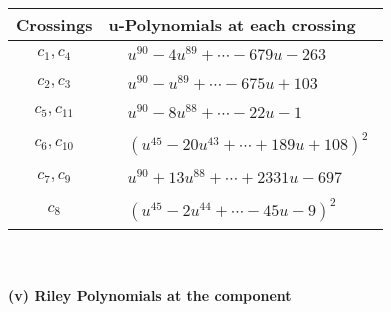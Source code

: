 \documentclass[1p]{elsarticle_modified}
\theoremstyle{definition}
\begin{document}
\begin{tabular}{m{50pt}|m{274pt}}
Crossings & \hspace{64pt}u-Polynomials at each crossing \\
\hline $$\begin{aligned}c_{1},c_{4}\end{aligned}$$&$\begin{aligned}
&u^{90}-4 u^{89}+\cdots-679 u-263
\end{aligned}$\\
\hline $$\begin{aligned}c_{2},c_{3}\end{aligned}$$&$\begin{aligned}
&u^{90}- u^{89}+\cdots-675 u+103
\end{aligned}$\\
\hline $$\begin{aligned}c_{5},c_{11}\end{aligned}$$&$\begin{aligned}
&u^{90}-8 u^{88}+\cdots-22 u-1
\end{aligned}$\\
\hline $$\begin{aligned}c_{6},c_{10}\end{aligned}$$&$\begin{aligned}
&(u^{45}-20 u^{43}+\cdots+189 u+108)^{2}
\end{aligned}$\\
\hline $$\begin{aligned}c_{7},c_{9}\end{aligned}$$&$\begin{aligned}
&u^{90}+13 u^{88}+\cdots+2331 u-697
\end{aligned}$\\
\hline $$\begin{aligned}c_{8}\end{aligned}$$&$\begin{aligned}
&(u^{45}-2 u^{44}+\cdots-45 u-9)^{2}
\end{aligned}$\\
\hline
\end{tabular}\\~\\
\newpage\renewcommand{\arraystretch}{1}
\flushleft \textbf{(v) Riley Polynomials at the component}\newline \\
\end{document}
